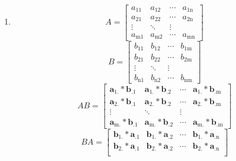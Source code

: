 \documentclass[11pt]{article}
\begin{document}
\begin{enumerate}
\begin{enumerate}
             \item 
             $$
             A = 
             \begin{bmatrix} 
             a_{\mathrm{11}} & a_{\mathrm{12}} &  \cdots & a_{\mathrm{1n}} \\
             a_{\mathrm{21}} & a_{\mathrm{22}} &  \cdots & a_{\mathrm{2n}} \\
             \vdots & \ddots & \vdots \\
             a_{\mathrm{m1}} & a_{\mathrm{m2}} &  \cdots & a_{\mathrm{mn}} 
             \end{bmatrix}
             $$
             \vskip 03pt
             $$
             B = 
             \begin{bmatrix} 
             b_{\mathrm{11}} & b_{\mathrm{12}} &  \cdots & b_{\mathrm{1m}} \\
             b_{\mathrm{21}} & b_{\mathrm{22}} &  \cdots & b_{\mathrm{2m}} \\
             \vdots & \ddots & \vdots \\
             b_{\mathrm{n1}} & b_{\mathrm{n2}} &  \cdots & b_{\mathrm{nm}} 
             \end{bmatrix}
             $$
             \vskip 03pt
             $$
             AB = 
             \begin{bmatrix} 
             \mathbf{a}_{\mathrm{1.}}*\mathbf{b}_{\mathrm{.1}} & \mathbf{a}_{\mathrm{1.}}*\mathbf{b}_{\mathrm{.2}} &  \cdots & \mathbf{a}_{\mathrm{1.}}*\mathbf{b}_{\mathrm{.m}} \\
             \mathbf{a}_{\mathrm{2.}}*\mathbf{b}_{\mathrm{.1}} & \mathbf{a}_{\mathrm{2.}}*\mathbf{b}_{\mathrm{.2}} &  \cdots & \mathbf{a}_{\mathrm{2.}}*\mathbf{b}_{\mathrm{.m}} \\
             \vdots & \ddots & \vdots \\
             \mathbf{a}_{\mathrm{m.}}*\mathbf{b}_{\mathrm{.1}} & \mathbf{a}_{\mathrm{m.}}*\mathbf{b}_{\mathrm{.2}} &  \cdots & \mathbf{a}_{\mathrm{m.}}*\mathbf{b}_{\mathrm{.m}}
             \end{bmatrix}
             $$
             \vskip 03pt
             $$
             BA = 
             \begin{bmatrix} 
             \mathbf{b}_{\mathrm{1.}}*\mathbf{a}_{\mathrm{.1}} & \mathbf{b}_{\mathrm{1.}}*\mathbf{a}_{\mathrm{.2}} &  \cdots & \mathbf{b}_{\mathrm{1.}}*\mathbf{a}_{\mathrm{.n}} \\
             \mathbf{b}_{\mathrm{2.}}*\mathbf{a}_{\mathrm{.1}} & \mathbf{b}_{\mathrm{2.}}*\mathbf{a}_{\mathrm{.2}} &  \cdots & \mathbf{b}_{\mathrm{2.}}*\mathbf{a}_{\mathrm{.n}} \\

\end{bmatrix}$$
\end{enumerate}
\end{enumerate}
\end{document}
